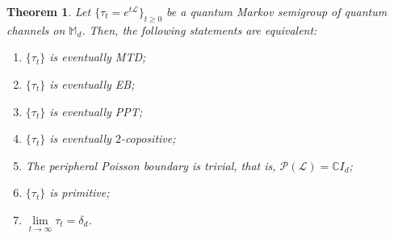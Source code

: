 \documentclass[11pt,reqno]{amsart}
\theoremstyle{definition}
\theoremstyle{plain}
\newtheorem{thm}[defn]{Theorem}
\theoremstyle{remark}
\numberwithin{equation}{section}%
\begin{document}
   \begin{thm}\label{EMD:thm4}
  	Let $\{\tau_t = e^{t\mathcal{L}}\}_{t \ge 0}$ be a quantum Markov semigroup of quantum channels on $\mathbb{M}_d$. Then, the following statements are equivalent:
  	\begin{enumerate}
  		\item $\{\tau_t\}$ is eventually MTD;
  		\item $\{\tau_t\}$ is eventually EB;
  		\item $\{\tau_t\}$ is eventually PPT;
  		\item $\{\tau_t\}$ is eventually $2$-copositive;
  		\item The peripheral Poisson boundary is trivial, that is, $\mathcal{P}(\mathcal{L})=\mathbb{C}I_d$;
  		\item $\{\tau_t\}$ is primitive;
  		\item $\lim\limits_{t\to\infty}\tau_t=\delta_d$.
  	\end{enumerate}
  \end{thm}
  
\end{document}
